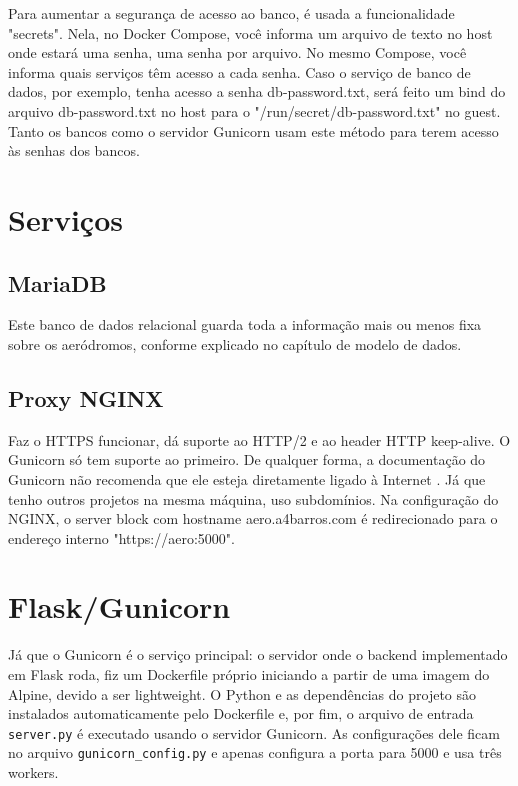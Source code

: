 Para aumentar a segurança de acesso ao banco, é usada a funcionalidade "secrets". Nela, no Docker Compose,
você informa um arquivo de texto no host onde estará uma senha, uma senha por arquivo. No mesmo Compose,
você informa quais serviços têm acesso a cada senha. Caso o serviço de banco de dados, por exemplo, tenha
acesso a senha db-password.txt, será feito um bind do arquivo db-password.txt no host para o "/run/secret/db-password.txt"
no guest.
Tanto os bancos como o servidor Gunicorn usam este método para terem acesso às senhas dos bancos.

\section{Serviços}

\subsection{MariaDB}
Este banco de dados relacional guarda toda a informação mais ou menos fixa sobre os aeródromos,
conforme explicado no capítulo de modelo de dados.

\subsection{Proxy NGINX}
Faz o HTTPS funcionar, dá suporte ao HTTP/2 e ao header HTTP keep-alive. O Gunicorn só tem suporte
ao primeiro. De qualquer forma, a documentação do Gunicorn não recomenda que ele esteja diretamente
ligado à Internet \cite{nginx-gunicorn}. Já que tenho outros projetos na mesma máquina, uso subdomínios.
Na configuração do NGINX, o server block com hostname aero.a4barros.com é redirecionado para 
o endereço interno "https://aero:5000".

\section{Flask/Gunicorn}

Já que o Gunicorn é o serviço principal: o servidor onde o backend implementado em Flask roda,
fiz um Dockerfile próprio iniciando a partir de uma imagem do Alpine, devido a ser lightweight.
O Python e as dependências do projeto são instalados automaticamente pelo Dockerfile e, por
fim, o arquivo de entrada \texttt{server.py} é executado usando o servidor Gunicorn. As configurações
dele ficam no arquivo \texttt{gunicorn\_config.py} e apenas configura a porta para 5000 e usa três workers.

